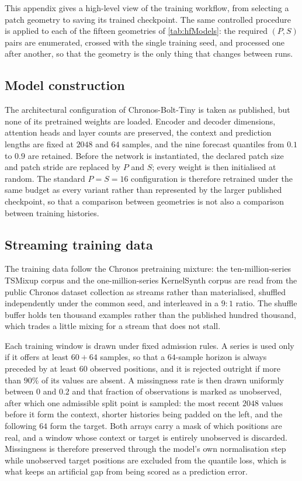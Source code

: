 This appendix gives a high-level view of the training workflow, from selecting a patch geometry to saving its trained checkpoint. The same controlled procedure is applied to each of the fifteen geometries of \autoref{tab:hfModels}: the required $(P,S)$ pairs are enumerated, crossed with the single training seed, and processed one after another, so that the geometry is the only thing that changes between runs.

\subsection{Model construction}

The architectural configuration of Chronos-Bolt-Tiny \autocite{AmazonChronosbolttinyHugging2025,FastAccurateZeroshot2024a} is taken as published, but none of its pretrained weights are loaded. Encoder and decoder dimensions, attention heads and layer counts are preserved, the context and prediction lengths are fixed at $2048$ and $64$ samples, and the nine forecast quantiles from $0.1$ to $0.9$ are retained. Before the network is instantiated, the declared patch size and patch stride are replaced by $P$ and $S$; every weight is then initialised at random. The standard $P=S=16$ configuration is therefore retrained under the same budget as every variant rather than represented by the larger published checkpoint, so that a comparison between geometries is not also a comparison between training histories.

\subsection{Streaming training data}

The training data follow the Chronos pretraining mixture\autocite{ansariChronosLearningLanguage2024,autogluonChronosDatasets2024}: the ten-million-series TSMixup corpus and the one-million-series KernelSynth corpus are read from the public Chronos dataset collection as streams rather than materialised, shuffled independently under the common seed, and interleaved in a $9{:}1$ ratio. The shuffle buffer holds ten thousand examples rather than the published hundred thousand, which trades a little mixing for a stream that does not stall.

Each training window is drawn under fixed admission rules. A series is used only if it offers at least $60+64$ samples, so that a $64$-sample horizon is always preceded by at least $60$ observed positions, and it is rejected outright if more than $90\%$ of its values are absent. A missingness rate is then drawn uniformly between $0$ and $0.2$ and that fraction of observations is marked as unobserved, after which one admissible split point is sampled: the most recent $2048$ values before it form the context, shorter histories being padded on the left, and the following $64$ form the target. Both arrays carry a mask of which positions are real, and a window whose context or target is entirely unobserved is discarded. Missingness is therefore preserved through the model's own normalisation step while unobserved target positions are excluded from the quantile loss, which is what keeps an artificial gap from being scored as a prediction error.

